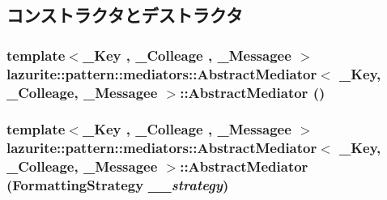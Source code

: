 \subsection{コンストラクタとデストラクタ}
\hypertarget{classlazurite_1_1pattern_1_1mediators_1_1_abstract_mediator_3_01___key_00_01___colleage_00_01___messagee_01_4_a008697ddfb30705dc7e2e535f0affd20}{
\subsubsection[{AbstractMediator}]{\setlength{\rightskip}{0pt plus 5cm}template$<$\_\-Key , \_\-Colleage , \_\-Messagee $>$ lazurite::pattern::mediators::AbstractMediator$<$ \_\-Key, \_\-Colleage, \_\-Messagee $>$::AbstractMediator ()}}
\label{classlazurite_1_1pattern_1_1mediators_1_1_abstract_mediator_3_01___key_00_01___colleage_00_01___messagee_01_4_a008697ddfb30705dc7e2e535f0affd20}
\hypertarget{classlazurite_1_1pattern_1_1mediators_1_1_abstract_mediator_3_01___key_00_01___colleage_00_01___messagee_01_4_a0de22ca46bae1588af449a71f5d548f4}{
\subsubsection[{AbstractMediator}]{\setlength{\rightskip}{0pt plus 5cm}template$<$\_\-Key , \_\-Colleage , \_\-Messagee $>$ lazurite::pattern::mediators::AbstractMediator$<$ \_\-Key, \_\-Colleage, \_\-Messagee $>$::AbstractMediator (FormattingStrategy {\em \_\-\_\-strategy})}}
\label{classlazurite_1_1pattern_1_1mediators_1_1_abstract_mediator_3_01___key_00_01___colleage_00_01___messagee_01_4_a0de22ca46bae1588af449a71f5d548f4}

